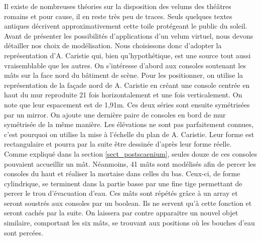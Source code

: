 Il existe de nombreuses théories sur la disposition des \glspl{velum} des théâtres romains et pour cause, il en reste très peu de traces. Seuls quelques textes antiques décrivent approximativement cette toile protégeant le public du soleil. Avant de présenter les possibilités d'applications d'un \gls{velum} virtuel, nous devons détailler nos choix de modélisation. Nous choisissons donc d'adopter la représentation d'A. Caristie \cite[Pl. VI]{orangePl} qui, bien qu'hypothétique, est une source tout aussi vraisemblable que les autres. On s'intéresse d'abord aux consoles soutenant les mâts sur la face nord du bâtiment de scène. Pour les positionner, on utilise la représentation de la façade nord de A. Caristie \cite[Pl. III]{orangePl} en créant une console centrée en haut du mur reproduite 21 fois horizontalement et une fois verticalement. On note que leur espacement est de 1,91m. Ces deux séries sont ensuite symétrisées par un \gls{mirror}. On ajoute une dernière paire de consoles en bord de mur symétrisée de la même manière. Les élévations ne sont pas parfaitement connues, c'est pourquoi on utilise la mise à l'échelle du plan de A. Caristie. Leur forme est rectangulaire et pourra par la suite être dessinée d'après leur forme réelle. Comme expliqué dans la section \ref{sect_postscaenium}, seules douze de ces consoles pouvaient accueillir un mât. Néanmoins, 41 mâts sont modélisés afin de percer les consoles du haut et réaliser la mortaise dans celles du bas. Ceux-ci, de forme cylindrique, se terminent dans la partie basse par une fine tige permettant de percer le trou d'évacuation d'eau. Ces mâts sont répétés grâce à un \gls{array} et seront soustrés aux consoles par un \gls{boolean}. Ils ne servent qu'à cette fonction et seront cachés par la suite. On laissera par contre apparaitre un nouvel objet similaire, comportant les six mâts, se trouvant aux positions où les bouches d'eau sont percées. 

